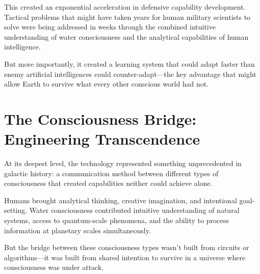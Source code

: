 \documentclass[12pt,a4paper]{book}
\begin{document}
This created an exponential acceleration in defensive capability development. Tactical problems that might have taken years for human military scientists to solve were being addressed in weeks through the combined intuitive understanding of water consciousness and the analytical capabilities of human intelligence.

But more importantly, it created a learning system that could adapt faster than enemy artificial intelligences could counter-adapt—the key advantage that might allow Earth to survive what every other conscious world had not.

\section{The Consciousness Bridge: Engineering Transcendence}

At its deepest level, the technology represented something unprecedented in galactic history: a communication method between different types of consciousness that created capabilities neither could achieve alone.

Humans brought analytical thinking, creative imagination, and intentional goal-setting. Water consciousness contributed intuitive understanding of natural systems, access to quantum-scale phenomena, and the ability to process information at planetary scales simultaneously.

But the bridge between these consciousness types wasn't built from circuits or algorithms—it was built from shared intention to survive in a universe where consciousness was under attack.
\end{document}
